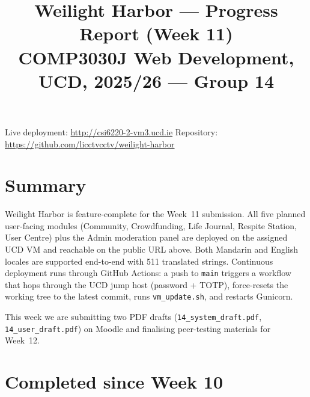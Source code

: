 

\title{\vspace{-1.5cm}\textbf{Weilight Harbor — Progress Report (Week 11)}\\
       \large COMP3030J Web Development, UCD, 2025/26 — Group 14}
\author{}
\date{}


\maketitle
\vspace{-2.0cm}
\begin{center}
  \small
  Live deployment: \url{http://csi6220-2-vm3.ucd.ie} \quad
  Repository: \url{https://github.com/licctvcctv/weilight-harbor}
\end{center}
\vspace{0.4cm}

\section{Summary}

Weilight Harbor is feature-complete for the Week~11 submission. All five
planned user-facing modules (Community, Crowdfunding, Life Journal,
Respite Station, User Centre) plus the Admin moderation panel are
deployed on the assigned UCD VM and reachable on the public URL above.
Both Mandarin and English locales are supported end-to-end with 511
translated strings. Continuous deployment runs through GitHub Actions: a
push to \texttt{main} triggers a workflow that hops through the UCD jump
host (password + TOTP), force-resets the working tree to the latest
commit, runs \texttt{vm\_update.sh}, and restarts Gunicorn.

This week we are submitting two PDF drafts
(\texttt{14\_system\_draft.pdf}, \texttt{14\_user\_draft.pdf}) on
Moodle and finalising peer-testing materials for Week~12.

\section{Completed since Week 10}

